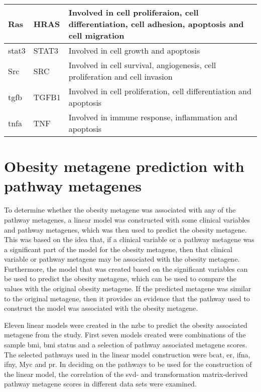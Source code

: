 \begin{longtable}{llp{8cm}}
	\hline
	\rule{0pt}{2.25ex}Ras         & HRAS   & Involved in cell proliferaion, cell differentiation, cell adhesion, apoptosis and cell migration\\
	\hline
	\rule{0pt}{2.25ex}\Gls{stat3} & STAT3  & Involved in cell growth and apoptosis\\
	\hline
	\rule{0pt}{2.25ex}Src         & SRC    & Involved in cell survival, angiogenesis, cell proliferation and cell invasion\\
	\hline
	\rule{0pt}{2.25ex}\Gls{tgfb}  & TGFB1  & Involved in cell proliferation, cell differentiation and apoptosis\\
	\hline
	\rule{0pt}{2.25ex}\Gls{tnfa}  & TNF    & Involved in immune response, inflammation and apoptosis\\
\end{longtable}

\section{Obesity metagene prediction with pathway metagenes}
\label{sec:obesity_metagene_prediction_with_pathway_metagenes}

To determine whether the obesity metagene was associated with any of the pathway metagenes, a linear model was constructed with some clinical variables and pathway metagenes, which was then used to predict the obesity metagene.
This was based on the idea that, if a clinical variable or a pathway metagene was a significant part of the model for the obesity metagene, then that clinical variable or pathway metagene may be associated with the obesity metagene.
Furthermore, the model that was created based on the significant variables can be used to predict the obesity metagene, which can be used to compare the values with the original obesity metagene.
If the predicted metagene was similar to the original metagene, then it provides an evidence that the pathway used to construct the model was associated with the obesity metagene.

Eleven linear models were created in the \gls{nzbc} to predict the obesity associated metagene from the \citet{Creighton2012} study.
First seven models created were combinations of the sample \gls{bmi}, \gls{bmi} status and a selection of pathway associated metagene scores.
The selected pathways used in the linear model construction were \gls{bcat}, \gls{er}, \gls{ifna}, \gls{ifny}, Myc and \gls{pr}.
In deciding on the pathways to be used for the construction of the linear model, the correlation of the \gls{svd}- and transformation matrix-derived pathway metagene scores in different data sets were examined.

